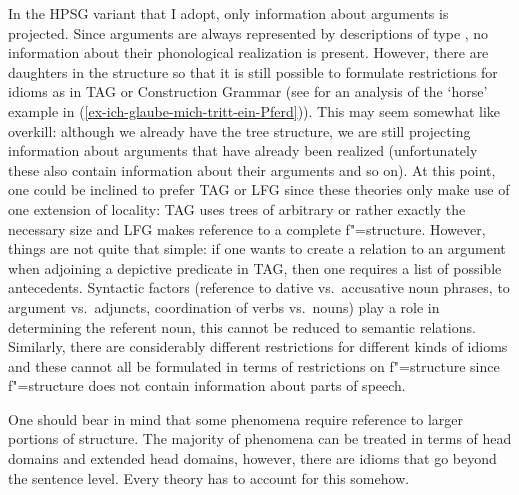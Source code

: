 In the HPSG variant that I adopt, only information about arguments is projected. Since arguments are always represented by descriptions of type
, no information about their phonological realization is present. However, there are daughters in the structure so that it is still
possible to formulate restrictions for idioms as in TAG or Construction Grammar (see 
for an analysis of the `horse' example in (\ref{ex-ich-glaube-mich-tritt-ein-Pferd})).
This may seem somewhat like overkill: although we already have the tree structure, we are still projecting information about arguments
that have already been realized (unfortunately these also contain information about their arguments and so on). At this point, one could be inclined
to prefer TAG or LFG since these theories only make use of one extension of locality: TAG uses trees
of arbitrary or rather exactly the necessary size and LFG makes reference to a complete
f"=structure. However, things are not quite that simple: if one wants to create a relation to an
argument when adjoining a depictive predicate in TAG, then one requires a list of
possible antecedents. Syntactic factors (\eg reference to dative vs.\ accusative noun phrases, to argument vs.\ adjuncts,
coordination of verbs vs.\ nouns) play a role in determining the referent noun, this cannot be reduced to semantic relations.
Similarly, there are considerably different restrictions for different kinds of idioms and these cannot all be formulated in terms of restrictions
on f"=structure since f"=structure does not contain information about parts of speech.

One should bear in mind that some phenomena require reference to larger portions of structure. The majority of phenomena can be treated in terms of head
domains and extended head domains, however, there are idioms that go beyond the sentence level. Every theory has to account for this somehow.



